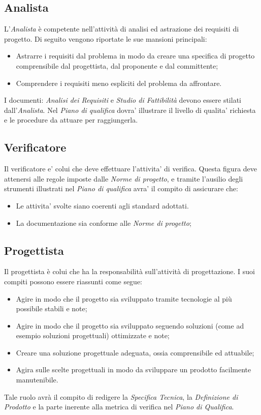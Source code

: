 \subsection{Analista}
L'\textit{Analista} è competente nell'attività di analisi ed astrazione dei requisiti di progetto.
Di seguito vengono riportate le sue mansioni principali:
\begin{itemize}
\item Astrarre i requisiti dal problema in modo da creare una specifica di progetto comprensibile dal progettista, dal proponente e dal committente;
\item Comprendere i requisiti meno espliciti del problema da affrontare.
\end{itemize}

I documenti: \textit{Analisi dei Requisiti} e \textit{Studio di Fattibilità} devono essere stilati dall'\textit{Analista}.
Nel \textit{Piano di qualifica} dovra' illustrare il livello di qualita' richiesta e le procedure da attuare per raggiungerla.

\subsection{Verificatore}
Il verificatore e' colui che deve effettuare l'attivita' di verifica. Questa figura deve attenersi alle regole imposte dalle \textit{Norme di progetto}, e tramite l'ausilio degli strumenti illustrati nel \textit{Piano di qualifica} avra' il compito di assicurare che:
\begin{itemize}
\item Le attivita' svolte siano coerenti agli standard adottati.
\item La documentazione sia conforme alle \textit{Norme di progetto};
\end{itemize}

\subsection{Progettista}
Il progettista è colui che ha la responsabilità sull'attività di progettazione. I suoi compiti possono essere riassunti come segue:
\begin{itemize}
\item Agire in modo che il progetto sia sviluppato tramite tecnologie al più possibile stabili e note;
\item Agire in modo che il progetto sia sviluppato seguendo soluzioni (come ad esempio soluzioni progettuali) ottimizzate e note;
\item Creare una soluzione progettuale adeguata, ossia comprensibile ed attuabile;
\item Agira sulle scelte progettuali in modo da sviluppare un prodotto facilmente manutenibile.
\end{itemize}
Tale ruolo avrà il compito di redigere la \textit{Specifica Tecnica}, la \textit{Definizione di Prodotto} e la parte inerente alla metrica di verifica nel \textit{Piano di Qualifica}.
